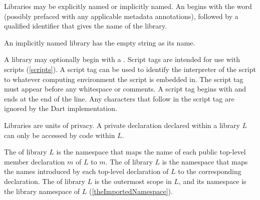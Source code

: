 \documentclass[makeidx]{article}
\begin{document}
\LMHash{}%
Libraries may be explicitly named or implicitly named.
An  begins with the word \LIBRARY{}
(possibly prefaced with any applicable metadata annotations),
followed by a qualified identifier that gives the name of the library.


\LMHash{}%
An implicitly named library has the empty string as its name.



\LMHash{}%
A library may optionally begin with a .
Script tags are intended for use with scripts (\ref{scripts}).
A script tag can be used to identify the interpreter of the script to
whatever computing environment the script is embedded in.
The script tag must appear before any whitespace or comments.
A script tag begins with \lit{\#!} and ends at the end of the line.
Any characters that follow \lit{\#!} in the script tag are ignored by
the Dart implementation.

\LMHash{}%
Libraries are units of privacy.
A private declaration declared within a library $L$
can only be accessed by code within $L$.


\LMHash{}%
The  of library $L$ is the namespace that maps
the name of each public top-level member declaration $m$ of $L$ to $m$.
The  of library $L$ is the namespace that maps
the names introduced by each top-level declaration of $L$
to the corresponding declaration.
The  of library $L$ is the outermost scope in $L$,
and its namespace is the library namespace of $L$
(\ref{theImportedNamespace}).
\end{document}
